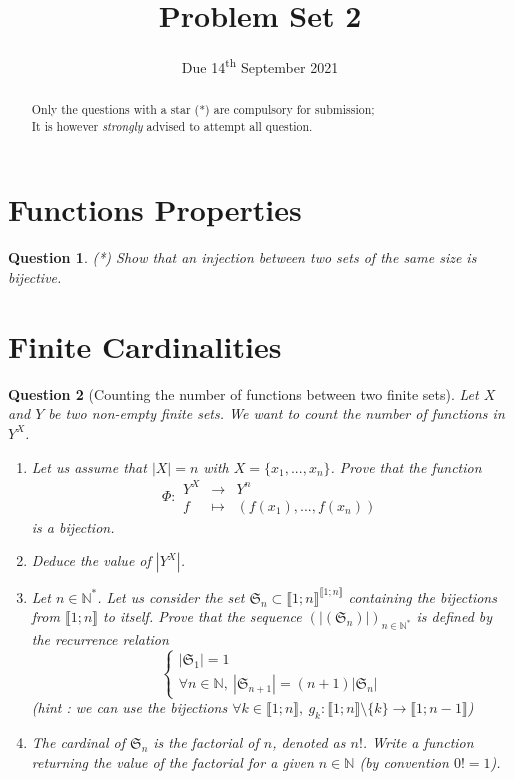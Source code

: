 \documentclass[]{article}
\title{Problem Set 2}
\author{}
\date{Due 14\textsuperscript{th} September 2021}
\newtheorem{question}{Question}
\newcommand{\N}{\mathbb{N}}
\newcommand{\card}[1]{| #1 |}
\begin{document}
\maketitle

\begin{abstract}
	Only the questions with a star (*) are compulsory for submission;\\
	It is however \textit{strongly} advised to attempt all question.
\end{abstract}

\section{Functions Properties}
\begin{question}
	(*) Show that an injection between two sets of the same size is bijective.
\end{question}

\section{Finite Cardinalities}

\begin{question}[Counting the number of functions between two finite sets]
	Let $X$ and $Y$ be two non-empty finite sets. We want to count the number of functions in $Y^X$.
	\begin{enumerate}[label=\alph*.]
		\item Let us assume that $\card{X} = n$ with $X = \{x_1,...,x_n\}$. Prove that the function
		\begin{equation*}
			\Phi : \begin{array}{lcl}
				Y^X&\longrightarrow&Y^n\\
				f&\longmapsto& (f(x_1),...,f(x_n))
			\end{array}
		\end{equation*}
		is a bijection.
		\item Deduce the value of $\card{Y^X}$.
		\item Let $n\in \N^*$. Let us consider the set $\mathfrak{S}_n\subset \llbracket 1;n\rrbracket^{\llbracket 1;n\rrbracket}$ containing the bijections from $\llbracket 1;n\rrbracket$ to itself. Prove that the sequence $(\card{(\mathfrak{S}_n)})_{n\in \N^*}$ is defined by the recurrence relation
		\begin{equation*}
			\left\{\begin{array}{l}
				\card{\mathfrak{S}_1} = 1\\
				\forall n\in \N,~\card{\mathfrak{S}_{n+1}} = (n+1)\card{\mathfrak{S}_n}
			\end{array}\right.
		\end{equation*}
		\textit{(hint : we can use the bijections $\forall k\in \llbracket 1;n\rrbracket,~ g_k:\llbracket 1;n\rrbracket \setminus \{k\}\rightarrow \llbracket 1;n-1\rrbracket$)}
		\item The cardinal of $\mathfrak{S}_n$ is the factorial of $n$, denoted as $n!$. Write a function returning the value of the factorial for a given $n\in \N$ (by convention $0! = 1$).
	\end{enumerate}
\end{question}
\end{document}
